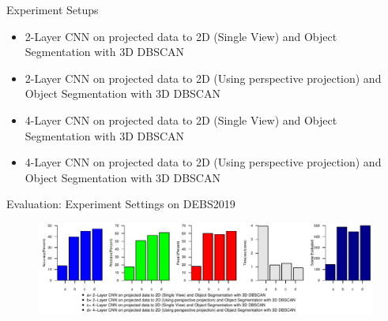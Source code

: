 \documentclass[9pt]{beamer}
\begin{document}
\begin{frame}[fragile]{Experiment Setups }
\begin{itemize}
	\item 2-Layer CNN on projected data to 2D (Single View) and Object Segmentation with 3D DBSCAN
	\item 2-Layer CNN on projected data to 2D (Using perspective projection) and Object Segmentation with 3D DBSCAN
	\item 4-Layer CNN on projected data to 2D (Single View) and Object Segmentation with 3D DBSCAN
	\item 4-Layer CNN on projected data to 2D (Using perspective projection) and Object Segmentation with 3D DBSCAN
\end{itemize}

\end{frame}


\begin{frame}[fragile]{Evaluation: Experiment Settings on DEBS2019 }
\begin{figure}
	\centering
	\includegraphics[width=\textwidth]{images/evaluation2.pdf}

\end{figure}
\end{frame}

\end{document}
